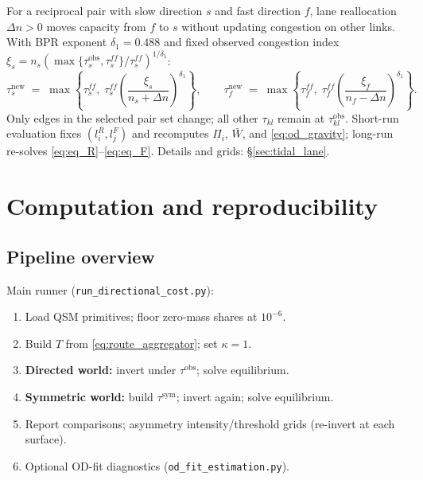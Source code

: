 \documentclass[12pt]{article}
\newcommand{\Wbar}{\bar W}
\newcommand{\obs}{\mathrm{obs}}
\newcommand{\sym}{\mathrm{sym}}
\begin{document}
For a reciprocal pair with slow direction $s$ and fast direction $f$, lane reallocation
$\Delta n>0$ moves capacity from $f$ to $s$ without updating congestion on other links.
With BPR exponent $\delta_1=0.488$ and fixed observed congestion index
$\xi_s = n_s(\max\{\tau^{\obs}_s,\tau^{ff}_s\}/\tau^{ff}_s)^{1/\delta_1}$:
\begin{equation}
  \tau_s^{\mathrm{new}}
  \;=\;
  \max\left\{
    \tau^{ff}_s,\;
    \tau^{ff}_s\left(\frac{\xi_s}{n_s+\Delta n}\right)^{\delta_1}
  \right\},
  \qquad
  \tau_f^{\mathrm{new}}
  \;=\;
  \max\left\{
    \tau^{ff}_f,\;
    \tau^{ff}_f\left(\frac{\xi_f}{n_f-\Delta n}\right)^{\delta_1}
  \right\}.
  \label{eq:tidal_bpr}
\end{equation}
Only edges in the selected pair set change; all other $\tau_{kl}$ remain at
$\tau^{\obs}_{kl}$.
Short-run evaluation fixes $(l_i^R,l_j^F)$ and recomputes $\Pi_i$, $\Wbar$, and
\eqref{eq:od_gravity}; long-run re-solves \eqref{eq:eq_R}--\eqref{eq:eq_F}.
Details and grids: \S\ref{sec:tidal_lane}.

\section{Computation and reproducibility}\label{sec:computation}

\subsection{Pipeline overview}

Main runner (\texttt{run\_directional\_cost.py}):
\begin{enumerate}[leftmargin=2em,itemsep=0.2em]
  \item Load QSM primitives; floor zero-mass shares at $10^{-6}$.
  \item Build $T$ from \eqref{eq:route_aggregator}; set $\kappa=1$.
  \item \textbf{Directed world:} invert under $\tau^{\obs}$; solve equilibrium.
  \item \textbf{Symmetric world:} build $\tau^{\sym}$; invert again; solve equilibrium.
  \item Report comparisons; asymmetry intensity/threshold grids (re-invert at each surface).
  \item Optional OD-fit diagnostics (\texttt{od\_fit\_estimation.py}).
\end{enumerate}
\end{document}

